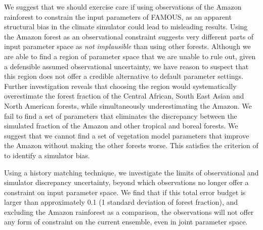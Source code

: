 \documentclass[esd, manuscript]{copernicus}
\begin{document}
We suggest that we should exercise care if using observations of the Amazon rainforest to constrain the input parameters of FAMOUS, as an apparent structural bias in the climate simulator could lead to misleading results. Using the Amazon forest as an observational constraint suggests very different parts of input parameter space as \emph{not implausible} than using other forests. Although we are able to find a region of parameter space that we are unable to rule out, given a defensible assumed observational uncertainty, we have reason to suspect that this region does not offer a credible alternative to default parameter settings. Further investigation reveals that choosing the region would systematically overestimate the forest fraction of the Central African, South East Asian and North American forests, while simultaneously underestimating the Amazon. We fail to find a set of parameters that eliminates the discrepancy between the simulated fraction of the Amazon and other tropical and boreal forests. We suggest that we cannot find a set of vegetation model parameters that improve the Amazon without making the other forests worse. This satisfies the criterion of \cite{williamson2014identifying} to identify a simulator bias. 

Using a history matching technique, we investigate the limits of observational and simulator discrepancy uncertainty, beyond which observations no longer offer a constraint on input parameter space. We find that if this total error budget is larger than approximately 0.1 (1 standard deviation of forest fraction), and excluding the Amazon rainforest as a comparison, the observations will not offer any form of constraint on the current ensemble, even in joint parameter space.

\end{document}
